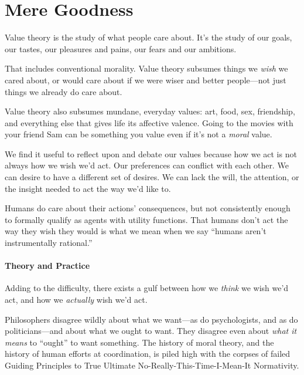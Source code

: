 \part{Mere Goodness}




{
 Value theory is the study of what people care about.
It's the study of our goals, our tastes, our pleasures
and pains, our fears and our ambitions.}

{
 That includes conventional morality. Value theory subsumes things
we \textit{wish} we cared about, or would care about if we were wiser
and better people---not just things we already do care about.}

{
 Value theory also subsumes mundane, everyday values: art, food,
sex, friendship, and everything else that gives life its affective
valence. Going to the movies with your friend Sam can be something you
value even if it's not a \textit{moral} value.}

{
 We find it useful to reflect upon and debate our values because
how we act is not always how we wish we'd act. Our
preferences can conflict with each other. We can desire to have a
different set of desires. We can lack the will, the attention, or the
insight needed to act the way we'd like to.}

{
 Humans do care about their actions' consequences,
but not consistently enough to formally qualify as agents with utility
functions. That humans don't act the way they wish they
would is what we mean when we say ``humans
aren't instrumentally rational.''}


\subsection{Theory and Practice}

{
 Adding to the difficulty, there exists a gulf between how we
\textit{think} we wish we'd act, and how we
\textit{actually} wish we'd act.}

{
 Philosophers disagree wildly about what we want---as do
psychologists, and as do politicians---and about what we ought to want.
They disagree even about \textit{what it means} to
``ought'' to want something. The
history of moral theory, and the history of human efforts at
coordination, is piled high with the corpses of failed Guiding
Principles to True Ultimate No-Really-This-Time-I-Mean-It Normativity.}

